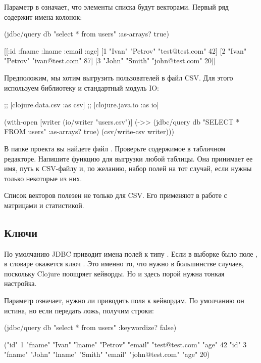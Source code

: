 Параметр  в  означает, что элементы списка будут векторами. Первый ряд содержит имена колонок:

\begin{english}
  \begin{clojure}
(jdbc/query db "select * from users" {:as-arrays? true})

[[:id :fname :lname :email :age]
 [1 "Ivan" "Petrov" "test@test.com" 42]
 [2 "Ivan" "Petrov" "ivan@test.com" 87]
 [3 "John" "Smith" "john@test.com" 20]]
  \end{clojure}
\end{english}

Предположим, мы хотим выгрузить пользователей в файл CSV. Для этого используем библиотеку  и стандартный модуль IO:

\begin{english}
  \begin{clojure}
;; [clojure.data.csv :as csv]
;; [clojure.java.io :as io]

(with-open [writer (io/writer "users.csv")]
  (->> (jdbc/query db
                   "SELECT * FROM users"
                   {:as-arrays? true})
       (csv/write-csv writer)))
  \end{clojure}
\end{english}

В папке проекта вы найдете файл . Проверьте содержимое в табличном редакторе. Напишите функцию для выгрузки любой таблицы. Она принимает ее имя, путь к CSV-файлу и, по желанию, набор полей на тот случай, если нужны только некоторые из них.

Список векторов полезен не только для CSV. Его применяют в работе с матрицами и статистикой.

\subsection{Ключи}

По умолчанию JDBC приводит имена полей к типу . Если в выборке было поле , в словаре окажется ключ . Это именно то, что нужно в большинстве случаев, поскольку Clojure поощряет кейворды. Но и здесь порой нужна тонкая настройка.

Параметр  означает, нужно ли приводить поля к кейвордам. По умолчанию он истина, но если передать ложь, получим строки:

\begin{english}
  \begin{clojure}
(jdbc/query db "select * from users"
               {:keywordize? false})

({"id" 1
  "fname" "Ivan"
  "lname" "Petrov"
  "email" "test@test.com"
  "age" 42}
 {"id" 3
  "fname" "John"
  "lname" "Smith"
  "email" "john@test.com"
  "age" 20})
  \end{clojure}
\end{english}

